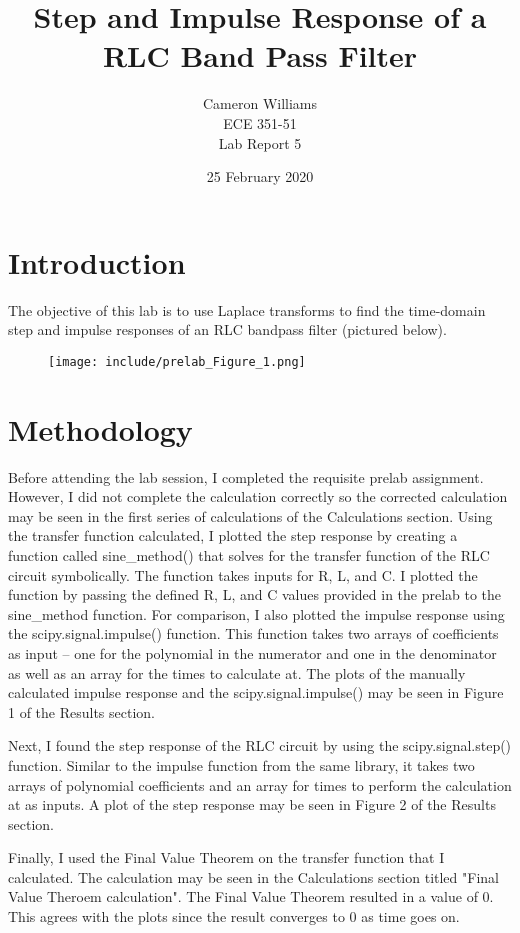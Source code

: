 \documentclass[12pt]{article}
\title{Step and Impulse Response of a RLC Band Pass Filter}
\author{Cameron Williams\\ECE 351-51\\Lab Report 5}
\date{25 February 2020}
\begin{document}
\vspace{\fill}
\maketitle
\vspace{\fill}
\clearpage

\newpage
\section{Introduction}
    \par The objective of this lab is to use Laplace transforms to find the time-domain step and impulse responses of an RLC bandpass filter (pictured below).
    
    \begin{figure}[h!]
        \centering
        \texttt{[image: include/prelab\_Figure\_1.png]}
    \end{figure}
\newpage

\section{Methodology}
    \par Before attending the lab session, I completed the requisite prelab assignment. However, I did not complete the calculation correctly so the corrected calculation may be seen in the first series of calculations of the Calculations section. Using the transfer function calculated, I plotted the step response by creating a function called sine\_method() that solves for the transfer function of the RLC circuit symbolically. The function takes inputs for R, L, and C. I plotted the function by passing the defined R, L, and C values provided in the prelab to the sine\_method function. For comparison, I also plotted the impulse response using the scipy.signal.impulse() function. This function takes two arrays of coefficients as input -- one for the polynomial in the numerator and one in the denominator as well as an array for the times to calculate at. The plots of the manually calculated impulse response and the scipy.signal.impulse() may be seen in Figure 1 of the Results section.
    \par Next, I found the step response of the RLC circuit by using the scipy.signal.step() function. Similar to the impulse function from the same library, it takes two arrays of polynomial coefficients and an array for times to perform the calculation at as inputs. A plot of the step response may be seen in Figure 2 of the Results section.
    \par Finally, I used the Final Value Theorem on the transfer function that I calculated. The calculation may be seen in the Calculations section titled "Final Value Theroem calculation". The Final Value Theorem resulted in a value of 0. This agrees with the plots since the result converges to 0 as time goes on.
\end{document}
